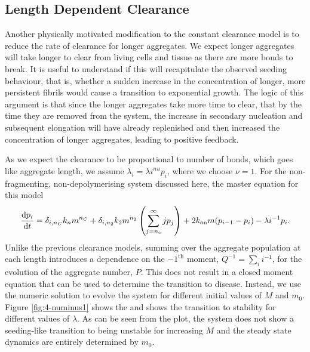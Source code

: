 
\subsection{Length Dependent Clearance}

Another physically motivated modification to the constant clearance model is to reduce the rate of clearance for longer aggregates. We expect longer aggregates will take longer to clear from living cells and tissue as there are more bonds to break. It is useful to understand if this will recapitulate the observed seeding behaviour, that is, whether a sudden increase in the concentration of longer, more persistent fibrils would cause a transition to exponential growth. The logic of this argument is that since the longer aggregates take more time to clear, that by the time they are removed from the system, the increase in secondary nucleation and subsequent elongation will have already replenished and then increased the concentration of longer aggregates, leading to positive feedback.

As we expect the clearance to be proportional to number of bonds, which goes like aggregate length, we assume $\lambda_i = \lambda i^{nu} p_i$, where we choose $\nu=1$. For the non-fragmenting, non-depolymerising system discussed here, the master equation for this model 
\begin{equation}
    \frac{\text{d}p_i}{\text{d}t} = \delta_{i, n_C}k_n m^{n_C} + \delta_{i, n_2} k_2 m^{n_2} \left(\sum_{j=n_{\mathrm{c}}}^{\infty} j p_j\right) + 2k_\text{on} m (p_{i-1}-p_i) - \lambda i^{-1} p_i.
    \label{eq:4-pi_evolution}
\end{equation}
Unlike the previous clearance models, summing over the aggregate population at each length introduces a dependence on the $-1^\text{th}$ moment, $Q^{-1}=\sum_i i^{-1}$, for the evolution of the aggregate number, $P$. This does not result in a closed moment equation that can be used to determine the transition to disease. Instead, we use the numeric solution to evolve the system for different initial values of $M$ and $m_0$. Figure \ref{fig:4-numinus1} shows the  and shows the transition to stability for different values of $\lambda$. As can be seen from the plot, the system does not show a seeding-like transition to being unstable for increasing $M$ and the steady state dynamics are entirely determined by $m_0$.

